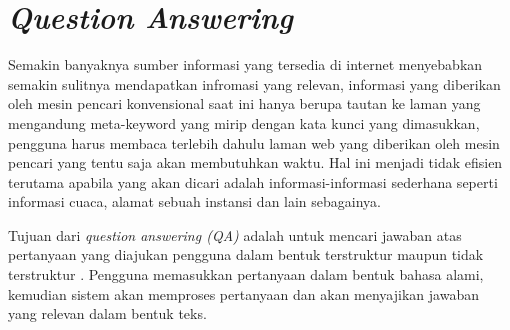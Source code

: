 \section{\textit{Question Answering}}
Semakin banyaknya sumber informasi yang tersedia di internet menyebabkan semakin sulitnya mendapatkan infromasi yang relevan, informasi yang diberikan oleh mesin pencari konvensional saat ini hanya berupa tautan ke laman yang mengandung meta-keyword yang mirip dengan kata kunci yang dimasukkan, pengguna harus membaca terlebih dahulu laman web yang diberikan oleh mesin pencari yang tentu saja akan membutuhkan waktu. Hal ini menjadi tidak efisien terutama apabila yang akan dicari adalah informasi-informasi sederhana seperti informasi cuaca, alamat sebuah instansi dan lain sebagainya. 

Tujuan dari \emph{question answering (QA)} adalah untuk mencari jawaban atas pertanyaan yang diajukan pengguna dalam bentuk terstruktur maupun tidak terstruktur \citep*{moussa_kader}. Pengguna memasukkan pertanyaan dalam bentuk bahasa alami, kemudian sistem akan memproses pertanyaan dan akan menyajikan jawaban yang relevan dalam bentuk teks.

